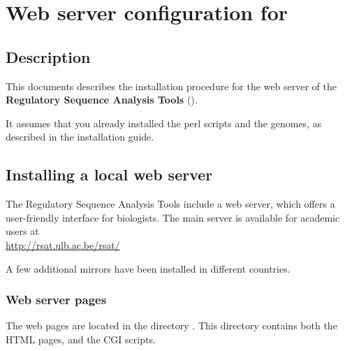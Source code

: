 \documentclass[12pt,a4paper, twoside]{scrreprt} %
\begin{document}


\newpage
\tableofcontents
\newpage

\chapter{Web server configuration for \RSAT}

\section{Description}

This documents describes the installation procedure for the web server
of the \textbf{Regulatory Sequence Analysis Tools} (\RSAT).

It assumes that you already installed the perl scripts and the
genomes, as described in the \RSAT installation guide.


\section{Installing a local web server}

The Regulatory Sequence Analysis Tools include a web server, which
offers a user-friendly interface for biologists. The main server is
available for academic users at \\
\url{http://rsat.ulb.ac.be/rsat/}

A few additional mirrors have been installed in different countries.

\subsection{Web server pages}

The web pages are located in the directory
. This directory contains both the HTML
pages, and the CGI scripts.
\end{document}
